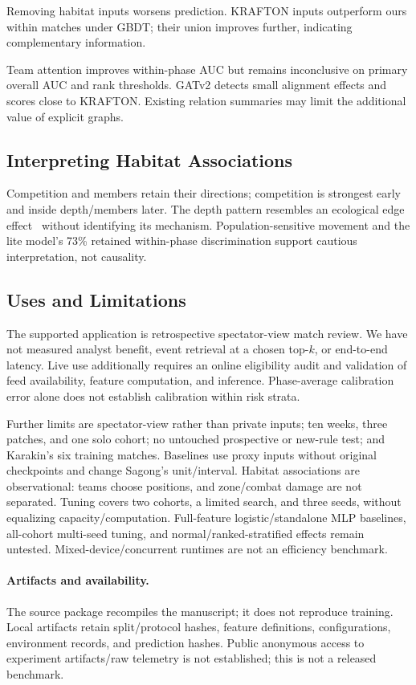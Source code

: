 \documentclass[sigconf,anonymous,nonacm]{acmart}
\begin{document}
Removing habitat inputs worsens prediction. KRAFTON inputs outperform ours within matches under GBDT; their union improves further, indicating complementary information.

Team attention improves within-phase AUC but remains inconclusive on primary overall AUC and rank thresholds. GATv2 detects small alignment effects and scores close to KRAFTON. Existing relation summaries may limit the additional value of explicit graphs.

\subsection{Interpreting Habitat Associations}
Competition and members retain their directions; competition is strongest early and inside depth/members later. The depth pattern resembles an ecological edge effect~\cite{Ries04} without identifying its mechanism. Population-sensitive movement and the lite model's 73\% retained within-phase discrimination support cautious interpretation, not causality.

\subsection{Uses and Limitations}
\label{sec:discussion:limits}
The supported application is retrospective spectator-view match review. We have not measured analyst benefit, event retrieval at a chosen top-$k$, or end-to-end latency. Live use additionally requires an online eligibility audit and validation of feed availability, feature computation, and inference. Phase-average calibration error alone does not establish calibration within risk strata.

Further limits are spectator-view rather than private inputs; ten weeks, three patches, and one solo cohort; no untouched prospective or new-rule test; and Karakin's six training matches. Baselines use proxy inputs without original checkpoints and change Sagong's unit/interval. Habitat associations are observational: teams choose positions, and zone/combat damage are not separated. Tuning covers two cohorts, a limited search, and three seeds, without equalizing capacity/computation. Full-feature logistic/standalone MLP baselines, all-cohort multi-seed tuning, and normal/ranked-stratified effects remain untested. Mixed-device/concurrent runtimes are not an efficiency benchmark.

\paragraph{Artifacts and availability.}
The source package recompiles the manuscript; it does not reproduce training. Local artifacts retain split/protocol hashes, feature definitions, configurations, environment records, and prediction hashes. Public anonymous access to experiment artifacts/raw telemetry is not established; this is not a released benchmark.
\end{document}

